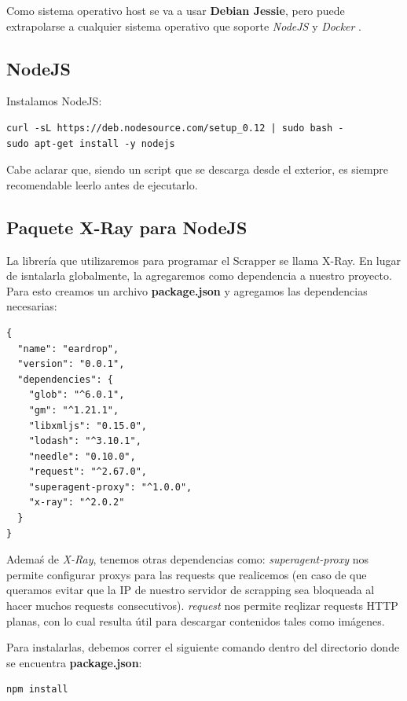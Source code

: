 \documentclass[12pt]{article}
\begin{document}
Como sistema operativo host se va a usar \textbf{Debian Jessie}, pero puede extrapolarse a cualquier sistema operativo que soporte \textit{NodeJS} y \textit{Docker} .

\subsection{NodeJS}

Instalamos NodeJS:


\begin{verbatim}
curl -sL https://deb.nodesource.com/setup_0.12 | sudo bash -
sudo apt-get install -y nodejs
\end{verbatim}

Cabe aclarar que, siendo un script que se descarga desde el exterior, es siempre recomendable leerlo antes de ejecutarlo.

\subsection{Paquete X-Ray para NodeJS }

La librería que utilizaremos para programar el Scrapper se llama X-Ray. En lugar de isntalarla globalmente, la agregaremos como dependencia a nuestro proyecto.
Para esto creamos un archivo \textbf{package.json} y agregamos las dependencias necesarias:

\begin{verbatim}
{
  "name": "eardrop",
  "version": "0.0.1",
  "dependencies": {
    "glob": "^6.0.1",
    "gm": "^1.21.1",
    "libxmljs": "0.15.0",
    "lodash": "^3.10.1",
    "needle": "0.10.0",
    "request": "^2.67.0",
    "superagent-proxy": "^1.0.0",
    "x-ray": "^2.0.2"
  }
}
\end{verbatim}

Ademaś de \textit{X-Ray}, tenemos otras dependencias como: \textit{superagent-proxy} nos permite configurar proxys para las requests que realicemos (en caso de que queramos evitar que la IP de nuestro servidor de scrapping sea bloqueada al hacer muchos requests consecutivos). \textit{request} nos permite reqlizar requests HTTP planas, con lo cual resulta útil para descargar contenidos tales como imágenes.

Para instalarlas, debemos correr el siguiente comando dentro del directorio donde se encuentra \textbf{package.json}:

\begin{verbatim}
npm install
\end{verbatim}
\end{document}
